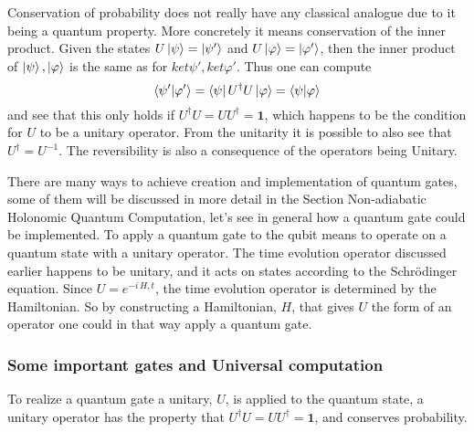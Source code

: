 Conservation of probability does not really have any classical analogue due to it being a quantum property. More concretely it means conservation of the inner product. Given the states $U\ket{\psi} = \ket{\psi'}$ and $U\ket{\varphi} = \ket{\varphi'}$, then the inner product of $\ket{\psi},\ket{\varphi}$ is the same as for $ket{\psi'},ket{\varphi'}$. Thus one can compute
\begin{equation}
\bra{\psi'}\ket{\varphi'} = \bra{\psi}U^\dagger U\ket{\varphi} = \bra{\psi}\ket{\varphi}
\end{equation}
and see that this only holds if $U^\dagger U = UU^\dagger = \mathbf{1}$, which happens to be the condition for $U$ to be a unitary operator. From the unitarity it is possible to also see that $U^\dagger = U^{-1}$. The reversibility is also a consequence of the operators being Unitary.

There are many ways to achieve creation and implementation of quantum gates, some of them will be discussed in more detail in the Section Non-adiabatic Holonomic Quantum Computation, let's see in general how a quantum gate could be implemented. To apply a quantum gate to the qubit means to operate on a quantum state with a unitary operator. The time evolution operator discussed earlier happens to be unitary, and it acts on states according to the Schrödinger equation. Since $U = e^{-i\,H,t}$, the time evolution operator is determined by the Hamiltonian. So by constructing a Hamiltonian, $H$, that gives $U$ the form of an operator one could in that way apply a quantum gate.


\subsubsection{Some important gates and Universal computation}
To realize a quantum gate a unitary, $U$, is applied to the quantum state, a unitary operator has the property that $U^\dagger U = UU^\dagger = \mathbf{1}$, and conserves probability. 


